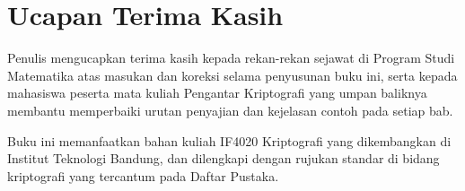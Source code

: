 \documentclass[../main.tex]{subfiles}
\begin{document}
\chapter*{Ucapan Terima Kasih}

Penulis mengucapkan terima kasih kepada rekan-rekan sejawat di Program Studi
Matematika atas masukan dan koreksi selama penyusunan buku ini, serta kepada
mahasiswa peserta mata kuliah Pengantar Kriptografi yang umpan baliknya
membantu memperbaiki urutan penyajian dan kejelasan contoh pada setiap bab.

Buku ini memanfaatkan bahan kuliah IF4020 Kriptografi yang dikembangkan di
Institut Teknologi Bandung, dan dilengkapi dengan rujukan standar di bidang
kriptografi yang tercantum pada Daftar Pustaka.

\clearpage
\end{document}
